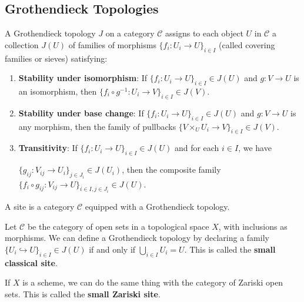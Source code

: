 \documentclass[12pt]{article}
\begin{document}
\subsection{Grothendieck Topologies}

\begin{definition}
    A Grothendieck topology $J$ on a category $\mathcal{C}$ assigns to each object $U$ in $\mathcal{C}$ a collection $J(U)$ of families of morphisms $\{f_i: U_i \to U\}_{i \in I}$ (called covering families or sieves) satisfying:

    \begin{enumerate}
        \item \textbf{Stability under isomorphism}: If $\{f_i: U_i \to U\}_{i \in I} \in J(U)$ and $g: V \to U$ is an isomorphism, then $\{f_i \circ g^{-1}: U_i \to V\}_{i \in I} \in J(V)$.

        \item \textbf{Stability under base change}: If $\{f_i: U_i \to U\}_{i \in I} \in J(U)$ and $g: V \to U$ is any morphism, then the family of pullbacks $\{V \times_U U_i \to V\}_{i \in I} \in J(V)$.

        \item \textbf{Transitivity}: If $\{f_i: U_i \to U\}_{i \in I} \in J(U)$ and for each $i \in I$, we have

              $\{g_{ij}: V_{ij} \to U_i\}_{j \in J_i} \in J(U_i)$, then the composite family $\{f_i \circ g_{ij}: V_{ij} \to U\}_{i \in I, j \in J_i} \in J(U)$.
    \end{enumerate}
\end{definition}

\begin{definition}[Site]
    A site is a category $\mathcal{C}$ equipped with a Grothendieck topology.
\end{definition}
\begin{example}
    Let $\mathcal{C}$ be the category of open sets in a topological space $X$, with inclusions as morphisms. We can define a Grothendieck topology by declaring a family $\{U_i \hookrightarrow U\}_{i \in I} \in J(U)$ if and only if $\bigcup_{i \in I} U_i = U$. This is called the \textbf{small classical site}.

    If $X$ is a scheme, we can do the same thing with the category of Zariski open sets. This is called the \textbf{small Zariski site}.
\end{example}
\end{document}
